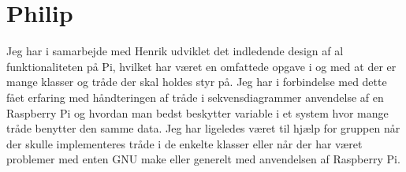 \section{Philip}

Jeg har i samarbejde med Henrik udviklet det indledende design af al funktionaliteten på Pi, hvilket har været en omfattede opgave i og med at der er mange klasser og tråde der skal holdes styr på. Jeg har i forbindelse med dette fået erfaring med håndteringen af tråde i sekvensdiagrammer anvendelse af en Raspberry Pi og hvordan man bedst beskytter variable i et system hvor mange tråde benytter den samme data. Jeg har ligeledes været til hjælp for gruppen når der skulle implementeres tråde i de enkelte klasser eller når der har været problemer med enten GNU make eller generelt med anvendelsen af Raspberry Pi.
